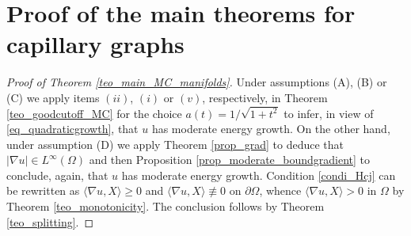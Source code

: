 \documentclass[10 pt,a4paper]{article}
\theoremstyle{definition}
\begin{document}
\section{Proof of the main theorems for capillary graphs}\label{sec_proof}

\begin{proof}[Proof of Theorem \ref{teo_main_MC_manifolds}]
	Under assumptions (A), (B) or (C) we apply items $(ii)$, $(i)$ or $(v)$, respectively, in Theorem \ref{teo_goodcutoff_MC} for the choice $a(t) = 1/\sqrt{1+t^2}$ to infer, in view of \eqref{eq_quadraticgrowth}, that $u$ has moderate energy growth. On the other hand, under assumption (D) we apply Theorem \ref{prop_grad} to deduce that $|\nabla u|\in L^\infty(\Omega)$ and then Proposition \ref{prop_moderate_boundgradient} to conclude, again, that $u$ has moderate energy growth. Condition \eqref{condi_Hcj} can be rewritten as $\langle \nabla u, X \rangle \ge 0$ and $\langle \nabla u, X \rangle \not \equiv 0$ on $\partial \Omega$, whence $\langle\nabla u,X\rangle>0$ in $\Omega$ by Theorem \ref{teo_monotonicity}. The conclusion follows by Theorem \ref{teo_splitting}.
\end{proof}
\end{document}
